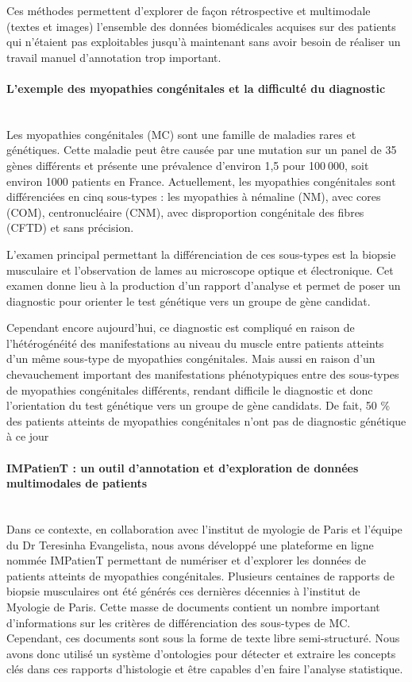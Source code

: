 Ces méthodes permettent d’explorer de façon rétrospective et multimodale (textes et images) l’ensemble des données biomédicales acquises sur des patients qui n’étaient pas exploitables jusqu’à maintenant sans avoir besoin de réaliser un travail manuel d’annotation trop important.

\paragraph{\textbf{L’exemple des myopathies congénitales et la difficulté du diagnostic}}\mbox{}\\

Les myopathies congénitales (MC) sont une famille de maladies rares et génétiques. Cette maladie peut être causée par une mutation sur un panel de 35 gènes différents et présente une prévalence d’environ 1,5 pour 100 000, soit environ 1000 patients en France. Actuellement, les myopathies congénitales sont différenciées en cinq sous-types : les myopathies à némaline (NM), avec cores (COM), centronucléaire (CNM), avec disproportion congénitale des fibres (CFTD) et sans précision.

L’examen principal permettant la différenciation de ces sous-types est la biopsie musculaire et l’observation de lames au microscope optique et électronique. Cet examen donne lieu à la production d’un rapport d’analyse et permet de poser un diagnostic pour orienter le test génétique vers un groupe de gène candidat.

Cependant encore aujourd’hui, ce diagnostic est compliqué en raison de l’hétérogénéité des manifestations au niveau du muscle entre patients atteints d’un même sous-type de myopathies congénitales. Mais aussi en raison d’un chevauchement important des manifestations phénotypiques entre des sous-types de myopathies congénitales différents, rendant difficile le diagnostic et donc l’orientation du test génétique vers un groupe de gène candidats. De fait, 50 \% des patients atteints de myopathies congénitales n’ont pas de diagnostic génétique à ce jour

\paragraph{\textbf{IMPatienT : un outil d’annotation et d’exploration de données multimodales de patients}}\mbox{}\\

Dans ce contexte, en collaboration avec l’institut de myologie de Paris et l’équipe du Dr Teresinha Evangelista, nous avons développé une plateforme en ligne nommée IMPatienT permettant de numériser et d’explorer les données de patients atteints de myopathies congénitales. Plusieurs centaines de rapports de biopsie musculaires ont été générés ces dernières décennies à l’institut de Myologie de Paris. Cette masse de documents contient un nombre important d’informations sur les critères de différenciation des sous-types de MC. Cependant, ces documents sont sous la forme de texte libre semi-structuré. Nous avons donc utilisé un système d’ontologies pour détecter et extraire les concepts clés dans ces rapports d’histologie et être capables d’en faire l’analyse statistique.

